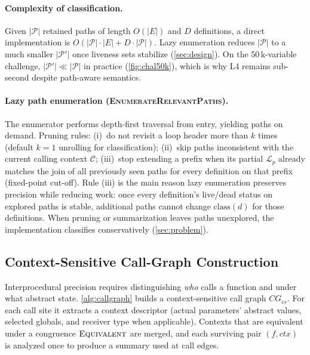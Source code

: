 \documentclass[acmsmall,screen,review,anonymous]{acmart}
\begin{document}
\paragraph{Complexity of classification.}
Given $|\mathcal{P}|$ retained paths of length $O(|E|)$ and $D$ definitions, a direct implementation is $O(|\mathcal{P}|\cdot|E|+D\cdot|\mathcal{P}|)$. Lazy enumeration reduces $|\mathcal{P}|$ to a much smaller $|\mathcal{P}'|$ once liveness sets stabilize (\autoref{sec:design}). On the 50\,k-variable challenge, $|\mathcal{P}'|\ll|\mathcal{P}|$ in practice (\autoref{fig:chal50k}), which is why L4 remains sub-second despite path-aware semantics.

\paragraph{Lazy path enumeration (\textsc{EnumerateRelevantPaths}).}
The enumerator performs depth-first traversal from entry, yielding paths on demand. Pruning rules: (i)~do not revisit a loop header more than $k$ times (default $k{=}1$ unrolling for classification); (ii)~skip paths inconsistent with the current calling context $\mathcal{C}$; (iii)~stop extending a prefix when its partial $\mathcal{L}_p$ already matches the join of all previously seen paths for every definition on that prefix (fixed-point cut-off). Rule (iii) is the main reason lazy enumeration preserves precision while reducing work: once every definition's live/dead status on explored paths is stable, additional paths cannot change $\mathrm{class}(d)$ for those definitions. When pruning or summarization leaves paths unexplored, the implementation classifies conservatively (\autoref{sec:problem}).

\subsection{Context-Sensitive Call-Graph Construction}
Interprocedural precision requires distinguishing \emph{who} calls a function and under what abstract state. \autoref{alg:callgraph} builds a context-sensitive call graph $CG_{cs}$. For each call site it extracts a context descriptor (actual parameters' abstract values, selected globals, and receiver type when applicable). Contexts that are equivalent under a congruence $\textsc{Equivalent}$ are merged, and each surviving pair $(f,ctx)$ is analyzed once to produce a summary used at call edges.
\end{document}
